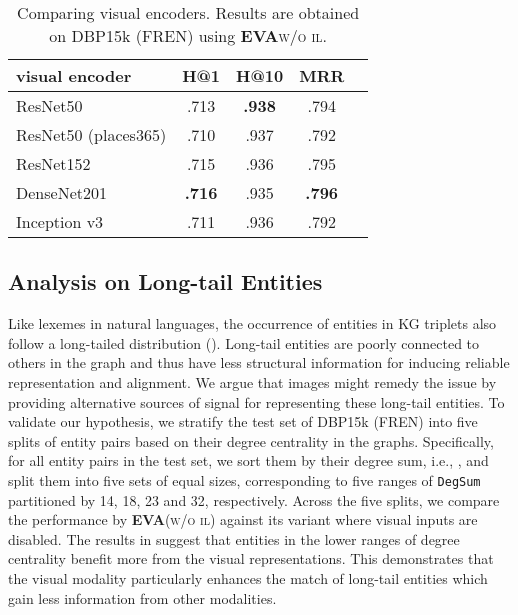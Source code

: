 \documentclass[letterpaper]{article} \usepackage{aaai21}  \usepackage{times}  \usepackage{helvet} \usepackage{courier}  \usepackage[hyphens]{url}  \usepackage{graphicx} \urlstyle{rm} \def\UrlFont{\rm}  \usepackage{natbib}  \usepackage{caption} \frenchspacing  \setlength{\pdfpagewidth}{8.5in}  \setlength{\pdfpageheight}{11in}
\newcommand{\modelname}[0]{\textbf{\textsc{EVA}}\xspace}
\begin{document}
\begin{table}[t!] \small
\renewcommand{\arraystretch}{0.9}
\setlength{\tabcolsep}{3.2pt}
\caption{\small Comparing visual encoders. Results are obtained on DBP15k (FREN) using \modelname \textsc{w/o il}.} 
\label{Table:visual_encoder}
\centering
\begin{tabular}{lcccc}
\toprule
visual encoder & H@1 & H@10 & MRR \\
\midrule
ResNet50	& .713 \scriptsize  & \textbf{.938} \scriptsize  & .794 \scriptsize  \\
ResNet50 (places365) & .710 \scriptsize 	& .937 \scriptsize  & .792 \scriptsize  \\
ResNet152	& .715 \scriptsize 	 & .936 \scriptsize  	& .795 \scriptsize   \\
DenseNet201	& \textbf{.716} \scriptsize 	& .935 \scriptsize 	& \textbf{.796} \scriptsize  \\
Inception v3 & .711 \scriptsize  & .936 \scriptsize  & .792 \scriptsize  \\
\bottomrule
\end{tabular}
\end{table}







\subsection{Analysis on Long-tail Entities}
\label{sec:long_tailed}

Like lexemes in natural languages, the occurrence of entities in KG triplets also follow a long-tailed distribution (). Long-tail entities are poorly connected to others in the graph and thus have less structural information for inducing reliable representation and alignment.
We argue that images might remedy the issue by providing alternative sources of signal for representing these long-tail entities. 
To validate our hypothesis, we stratify the test set of DBP15k (FREN) into five splits of entity pairs based on their degree centrality in the graphs. Specifically, for all entity pairs  in the test set, we sort them by their degree sum, i.e., , and split them into five sets of equal sizes, 
corresponding to five ranges of \texttt{DegSum} partitioned by 14, 18, 23 and 32, respectively. 
Across the five splits, we compare the performance by \modelname (\textsc{w/o il}) against its variant where visual inputs are disabled.
The results in  suggest that entities in the lower ranges of degree centrality benefit more from the visual representations.
This demonstrates that the visual modality particularly enhances the match of long-tail entities which gain less information from other modalities.
\end{document}
